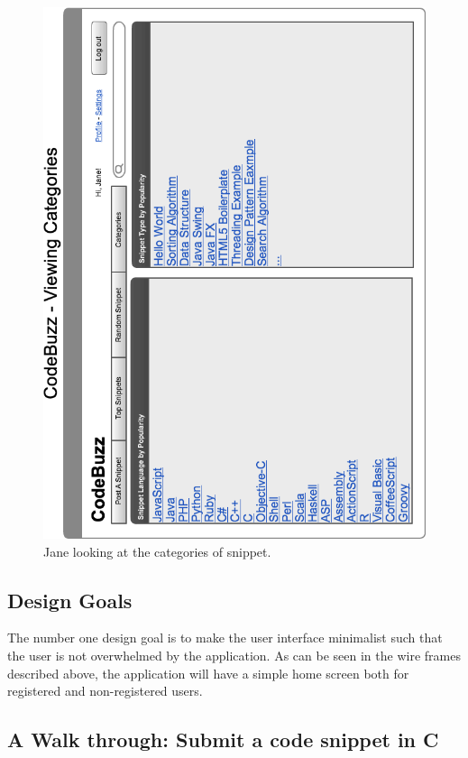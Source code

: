 \documentclass[11pt,a4paper]{article}
\begin{document}
\begin{figure}
\includegraphics[width=\textwidth]{../imgs/viewingCategoriesHorz.png}
\caption{Jane looking at the categories of snippet.}
\label{fig:viewCategories}
\end{figure}

\subsection{Design Goals}

The number one design goal is to make the user interface minimalist
such that the user is not overwhelmed by the application. As can be
seen in the wire frames described above, the application will have a simple
home screen both for registered and non-registered users.

\newpage

\subsection{A Walk through: Submit a code snippet in C}
\end{document}
